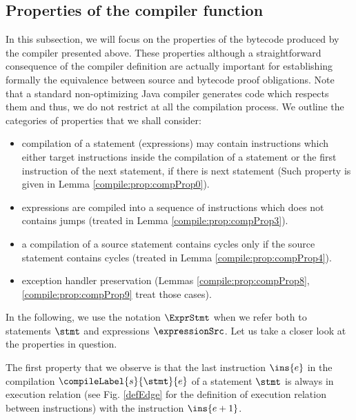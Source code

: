 \subsection{Properties of the compiler function}\label{compile:prop}
In this subsection, we will focus on the properties of the  bytecode produced by the compiler presented above.
These properties although a straightforward consequence of the compiler definition
 are actually important for establishing formally the equivalence between source and bytecode 
proof obligations. Note that a standard non-optimizing Java compiler generates code which respects them and thus, we
do not restrict at all the compilation process.  We outline the categories of properties that we shall consider:
\begin{itemize}
     
     \item compilation of a statement (expressions) may contain instructions which either target instructions inside the compilation of a statement or  the 
           first instruction of the next statement, if there is next statement (Such property is given in Lemma \ref{compile:prop:compProp0}).
     
     \item expressions are compiled into a sequence of instructions which does not contains jumps (treated in Lemma \ref{compile:prop:compProp3}).
     

     \item a compilation of a source statement contains cycles only if the source statement contains cycles (treated in Lemma \ref{compile:prop:compProp4}).
     
     \item exception handler preservation (Lemmas \ref{compile:prop:compProp8}, \ref{compile:prop:compProp9} treat those cases). %
     
\end{itemize}




In the following, we use the notation $\ExprStmt$ when we refer both to statements $\stmt$ and expressions $\expressionSrc$.
Let us take a closer look at the properties in question.
 
 The first property that we observe is that the last instruction $\ins{e}$ in the compilation
 $\compileLabel{s}{\stmt}{e}$  of a statement $\stmt$ is always in execution relation
 (see Fig. \ref{defEdge} for the definition of execution relation between instructions) with the
 instruction $\ins{e + 1}$.

